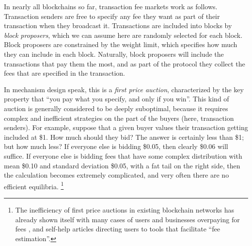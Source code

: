\documentclass[12pt, final]{article}
\begin{document}
In nearly all blockchains so far, transaction fee markets work as follows. Transaction senders are free to specify any fee they want as part of their transaction when they broadcast it. Transactions are included into blocks by \emph{block proposers}, which we can assume here are randomly selected for each block. Block proposers are constrained by the weight limit, which specifies how much they can include in each block. Naturally, block proposers will include the transactions that pay them the most, and as part of the protocol they collect the fees that are specified in the transaction.

In mechanism design speak, this is a \emph{first price auction}, characterized by the key property that ``you pay what you specify, and only if you win''. This kind of auction is generally considered to be deeply suboptimal, because it requires complex and inefficient strategies on the part of the buyers (here, transaction senders). For example, suppose that a given buyer values their transaction getting included at \$1. How much should they bid? The answer is certainly less than \$1; but how much less? If everyone else is bidding \$0.05, then clearly \$0.06 will suffice. If everyone else is bidding fees that have some complex distribution with mean \$0.10 and standard deviation \$0.05, with a fat tail on the right side, then the calculation becomes extremely complicated, and very often there are no efficient equilibria. \cite{poa-in-auctions} \footnote{The inefficiency of first price auctions in existing blockchain networks has already shown itself with many cases of users and businesses overpaying for fees \cite{bithumb-fees}, and self-help articles directing users to tools that facilitate ``fee estimation''\cite{fee-estimation}.}
\end{document}
